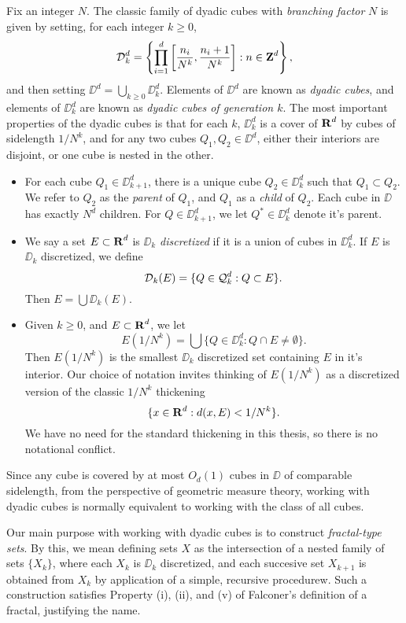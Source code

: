 Fix an integer $N$. The classic family of dyadic cubes with \emph{branching factor} $N$ is given by setting, for each integer $k \geq 0$,
%
\[ \operatorname{\mathcal{D}}_k^d = \left\{ \prod_{i = 1}^d \left[ \frac{n_i}{N^k}, \frac{n_i + 1}{N^k} \right] : n \in \operatorname{\mathbf{Z}}^d \right\}, \]
%
and then setting $\DD^d = \bigcup_{k \geq 0} \DD_k^d$. Elements of $\DD^d$ are known as \emph{dyadic cubes}, and elements of $\DD_k^d$ are known as \emph{dyadic cubes of generation $k$}. The most important properties of the dyadic cubes is that for each $k$, $\DD_k^d$ is a cover of $\operatorname{\mathbf{R}}^d$ by cubes of sidelength $1/N^k$, and for any two cubes $Q_1,Q_2 \in \DD^d$, either their interiors are disjoint, or one cube is nested in the other.
%
\begin{itemize}
	\item For each cube $Q_1 \in \DD_{k+1}^d$, there is a unique cube $Q_2 \in \DD_k^d$ such that $Q_1 \subset Q_2$. We refer to $Q_2$ as the \emph{parent} of $Q_1$, and $Q_1$ as a \emph{child} of $Q_2$. Each cube in $\DD$ has exactly $N^d$ children. For $Q \in \DD_{k+1}^d$, we let $Q^* \in \DD_k^d$ denote it's parent.

	\item We say a set $E \subset \operatorname{\mathbf{R}}^d$ is \emph{$\DD_k$ discretized} if it is a union of cubes in $\DD_k^d$. If $E$ is $\DD_k$ discretized, we define
	\[ \operatorname{\mathcal{D}}_k(E) = \{ Q \in \operatorname{\mathcal{Q}}_k^d : Q \subset E \}. \]
	Then $E = \bigcup \DD_k(E)$.

	\item Given $k \geq 0$, and $E \subset \operatorname{\mathbf{R}}^d$, we let
	\[ E(1/N^k) = \bigcup \{ Q \in \DD_k^d : Q \cap E \neq \emptyset \}. \]
	Then $E(1/N^k)$ is the smallest $\DD_k$ discretized set containing $E$ in it's interior. Our choice of notation invites thinking of $E(1/N^k)$ as a discretized version of the classic $1/N^k$ thickening
	\[ \{ x \in \operatorname{\mathbf{R}}^d : d(x,E) < 1/N^k \}. \]
	We have no need for the standard thickening in this thesis, so there is no notational conflict.
\end{itemize}
%
Since any cube is covered by at most $O_d(1)$ cubes in $\DD$ of comparable sidelength, from the perspective of geometric measure theory, working with dyadic cubes is normally equivalent to working with the class of all cubes.

Our main purpose with working with dyadic cubes is to construct \emph{fractal-type sets}. By this, we mean defining sets $X$ as the intersection of a nested family of sets $\{ X_k \}$, where each $X_k$ is $\DD_k$ discretized, and each succesive set $X_{k+1}$ is obtained from $X_k$ by application of a simple, recursive procedurew. Such a construction satisfies Property (i), (ii), and (v) of Falconer's definition of a fractal, justifying the name.

